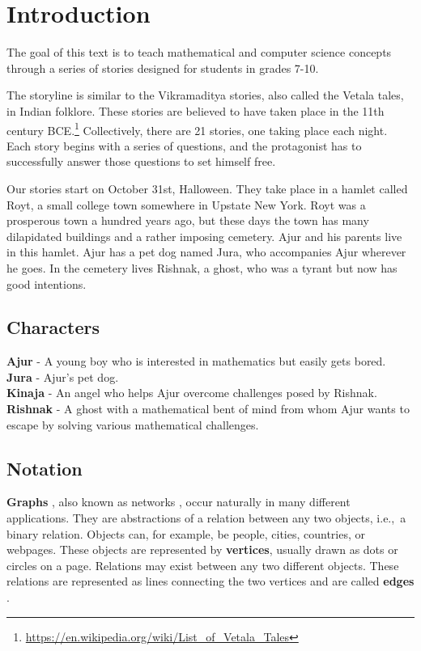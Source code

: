 \chapter{Introduction}
The goal of this text is to teach mathematical and computer science concepts through a series of stories
designed for students in grades 7-10.

The storyline is similar to the Vikramaditya stories, also called the Vetala tales, in Indian folklore. These stories are believed to have taken place in the 11th century BCE.\footnote{\url{https://en.wikipedia.org/wiki/List_of_Vetala_Tales}}
Collectively, there are 21 stories, one taking place each night. Each story begins with a series of questions, and the protagonist has to successfully answer those questions to set himself free. 


Our stories start on October 31st, Halloween. They take place in a hamlet called Royt, a small college town somewhere in Upstate New York. Royt was a prosperous town a hundred years ago, but these days the town has many dilapidated buildings and a rather imposing cemetery. Ajur and his parents live in this hamlet. Ajur has a pet dog named Jura, who accompanies Ajur wherever he goes.  In the cemetery lives Rishnak, a ghost, who was a tyrant but now has good intentions.

\section{Characters}

\textbf {Ajur} - A young boy who is interested in mathematics but easily gets bored.\\
\noindent
\textbf {Jura} - Ajur's pet dog.\\
\noindent
\textbf{Kinaja} - An angel who helps Ajur overcome challenges posed by Rishnak.\\
\noindent
\textbf{Rishnak} - A ghost with a mathematical bent of mind from whom Ajur wants to escape by solving various mathematical challenges.\\

\section{Notation}
\textbf{Graphs} , also known as networks , occur naturally in many different applications. They are abstractions of a relation between any two objects, i.e.,~a binary relation. Objects can, for example, be people, cities, countries, or webpages. These objects are represented by \textbf{vertices},  usually drawn as dots 
or circles on a page. Relations may exist between any two different objects. These relations are represented as lines connecting the two vertices and are called \textbf{edges} .

